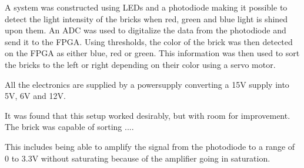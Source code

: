 A system was constructed using LEDs and a photodiode making it possible to detect the light intensity of the bricks when red, green and blue light is shined upon them.
An ADC was used to digitalize the data from the photodiode and send it to the FPGA.
Using thresholds, the color of the brick was then detected on the FPGA as either blue, red or green.
This information was then used to sort the bricks to the left or right depending on their color using a servo motor.

All the electronics are supplied by a powersupply converting a 15V supply into 5V, 6V and 12V.

It was found that this setup worked desirably, but with room for improvement.
The brick was capable of sorting ....

This includes being able to amplify the signal from the photodiode to a range of 0 to 3.3V without saturating because of the amplifier going in saturation.






